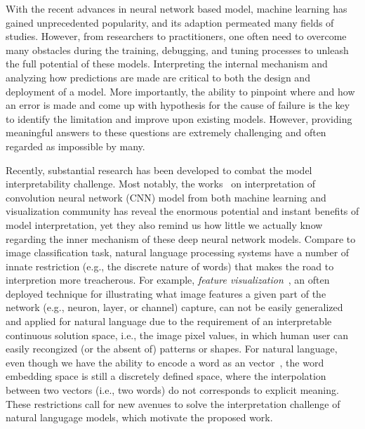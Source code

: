 \maketitle

With the recent advances in neural network based model, machine learning has gained unprecedented popularity, and its adaption permeated many fields of studies.
%
However, from researchers to practitioners, one often need to overcome many obstacles during the training, debugging, and tuning processes to unleash the full potential of these models.
%
Interpreting the internal mechanism and analyzing how predictions are made are critical to both the design and deployment of a model.
More importantly, the ability to pinpoint where and how an error is made and come up with hypothesis for the cause of failure is the key to identify the limitation and improve upon existing models.
However, providing meaningful answers to these questions are extremely challenging and often regarded as impossible by many.

Recently, substantial research has been developed to combat the model interpretability challenge. Most notably, the works~\cite{SimonyanVedaldiZisserman2013, ZeilerFergus2014, YosinskiCluneNguyen2015, OlahMordvintsevSchubert2017, LiuShiLi2017, OlahSatyanarayanJohnson2018, BilalJourablooYe2018} on interpretation of convolution neural network (CNN) model from both machine learning and visualization community has reveal the enormous potential and instant benefits of model interpretation, yet they also remind us how little we actually know regarding the inner mechanism of these deep neural network models.
%
Compare to image classification task, natural language processing systems have a number of innate restriction (e.g., the discrete nature of words) that makes the road to interpretion more treacherous. For example, \emph{feature visualization}~\cite{OlahMordvintsevSchubert2017}, an often deployed technique for illustrating what image features a given part of the network (e.g., neuron, layer, or channel) capture, can not be easily generalized and applied for natural language due to the requirement of an interpretable continuous solution space, i.e., the image pixel values, in which human user can easily recongized (or the absent of) patterns or shapes. For natural language, even though we have the ability to encode a word as an vector~\cite{MikolovSutskeverChen2013, PenningtonSocherManning2014}, the word embedding space is still a discretely defined space, where the interpolation between two vectors (i.e., two words) do not corresponds to explicit meaning.
%
These restrictions call for new avenues to solve the interpretation challenge of natural langugage models, which motivate the proposed work.

